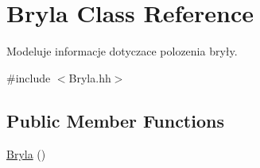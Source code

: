 \hypertarget{class_bryla}{\section{Bryla Class Reference}
\label{class_bryla}
}


Modeluje informacje dotyczace polozenia bryły.  




{\ttfamily \#include $<$Bryla.\+hh$>$}

\subsection*{Public Member Functions}
\begin{DoxyCompactItemize}
\item 
\hypertarget{class_bryla_aa7f9e60dcccdd4ade301c4be4aa7c7fb}{\hyperlink{class_bryla_aa7f9e60dcccdd4ade301c4be4aa7c7fb}{Bryla} ()}\label{class_bryla_aa7f9e60dcccdd4ade301c4be4aa7c7fb}


\end{DoxyCompactItemize}
